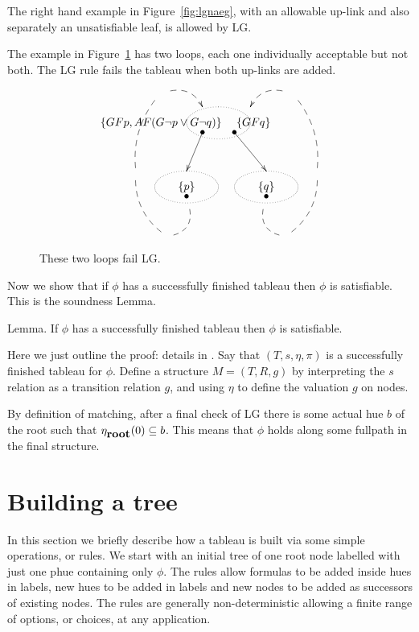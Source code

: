 \documentclass[submission,copyright,creativecommons]{eptcs}
\newcommand{\fut}{F}
\newcommand{\alw}{G}
\newcommand{\nec}{{A}}
\newenvironment{lemma}{Lemma. }{}
\begin{document}
The right hand example in Figure~\ref{fig:lgnaeg},
with an allowable up-link and also separately
an unsatisfiable leaf,
is allowed by LG.

The example in Figure~\ref{fig:lgtwoeg} has two loops, each 
one individually acceptable but not both.
The LG rule fails the tableau when both up-links are added.


\begin{figure}


\[
\xy
(20,50)*\xycircle(10,5){.};
(2,50)*{\{GFp, \nec \fut ( \alw \neg p \vee \alw \neg q)\}};
(15,47)*{\bullet};
(31,50)*{\{GF q \}};
(25,47)*{\bullet};
{\ar(15,47)*{};(10,35)*{}};
(10,30)*\xycircle(10,5){.};
(10,30)*{\{ p\}};
(10,27)*{\bullet};
{\ar @{--} @/^/(11,23)*{};(6,15)*{}};
{\ar@{--} @/^/(2,16)*{};(-6,32)*{}};
{\ar@{--} @/^/(-6,36)*{};(0,57)*{}};
{\ar@{-->} @/^/(5,60)*{};(15,55)*{}};
{\ar(25,47)*{};(35,35)*{}};
(35,30)*\xycircle(10,5){.};
(35,30)*{\{ q \}};
(35,27)*{\bullet};
{\ar @{--} @/_/(34,23)*{};(39,15)*{}};
{\ar@{--} @/_/(43,16)*{};(51,32)*{}};
{\ar@{--} @/_/(51,36)*{};(45,57)*{}};
{\ar@{-->} @/_/(40,60)*{};(30,55)*{}};
\endxy
\]

\caption{These two loops fail LG.}

\label{fig:lgtwoeg}
\end{figure}


Now we show that if $\phi$ has a successfully finished tableau
then $\phi$ is satisfiable.
This is the soundness Lemma.

\begin{lemma}
If $\phi$ has a successfully finished tableau
then $\phi$ is satisfiable.
\end{lemma}

Here we just outline the proof: details in \cite{Rey:fasttablong}.
Say that $(T,s,\eta,\pi)$ is a successfully finished tableau for $\phi$.
Define a structure $M=(T,R,g)$ 
by interpreting the $s$ relation as a transition relation $g$,
and using $\eta$ to define the valuation $g$ on nodes.

 By definition of matching,
 after a final check of LG
 there is some actual hue $b$ of the root 
 such that $\eta_{\mbox{\bf root}}(0) \subseteq b$.
 This means that $\phi$ holds
 along some fullpath in the 
 final structure.


\section{Building a tree}
\label{sec:build}

In this section we briefly describe how a tableau is built via some simple operations, or rules.
We start with an initial tree of one root node labelled with just one
phue containing only $\phi$.
The rules allow formulas to be added inside hues in labels,
new hues to be added in labels
and
new nodes to be added as successors 
of existing nodes.
The rules are generally non-deterministic allowing
a finite range of options,
or choices,
at any application.
\end{document}
